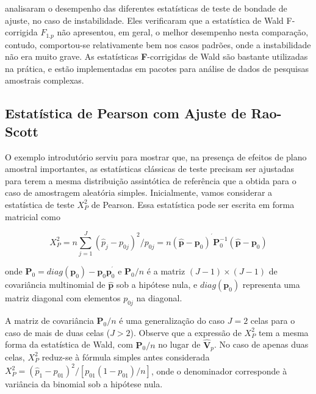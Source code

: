 \documentclass[]{book}
\theoremstyle{definition}
\theoremstyle{definition}
\theoremstyle{definition}
\theoremstyle{remark}
\begin{document}
\citep{TR87} analisaram o desempenho das diferentes estatísticas de
teste de bondade de ajuste, no caso de instabilidade. Eles verificaram
que a estatística de Wald F-corrigida \(F_{1.p}\) não apresentou, em
geral, o melhor desempenho nesta comparação, contudo, comportou-se
relativamente bem nos casos padrões, onde a instabilidade não era muito
grave. As estatísticas \textbf{F}-corrigidas de Wald são bastante
utilizadas na prática, e estão implementadas em pacotes para análise de
dados de pesquisas amostrais complexas.

\subsection{Estatística de Pearson com Ajuste de
Rao-Scott}\label{raoscott}

O exemplo introdutório serviu para mostrar que, na presença de efeitos
de plano amostral importantes, as estatísticas clássicas de teste
precisam ser ajustadas para terem a mesma distribuição assintótica de
referência que a obtida para o caso de amostragem aleatória simples.
Inicialmente, vamos considerar a estatística de teste \(X_{P}^{2}\) de
Pearson\(.\) Essa estatística pode ser escrita em forma matricial como

\begin{equation}
X_{P}^{2}=n\sum\limits_{j=1}^{J}\left( \widehat{p}_{j}-p_{0j}\right)
^{2}/p_{0j}=n\left( \widehat{\mathbf{p}}-\mathbf{p}_{0}\right) ^{^{\prime }}
\mathbf{P}_{0}^{-1}\left( \widehat{\mathbf{p}}-\mathbf{p}_{0}\right) 
\label{eq:qual11}
\end{equation}

onde
\(\mathbf{P}_{0}=diag\left( \mathbf{p}_{0}\right) -\mathbf{p}_{0}\mathbf{p}_{0}^{^{\prime }}\)
e \(\mathbf{P}_{0}/n\) é a matriz
\(\left( J-1\right)\times \left( J-1\right)\) de covariância multinomial
de \(\widehat{\mathbf{p}}\) sob a hipótese nula, e
\(diag\left( \mathbf{p}_{0}\right)\) representa uma matriz diagonal com
elementos \(p_{0j}\) na diagonal.

A matriz de covariância \(\mathbf{P}_{0}/n\) é uma generalização do caso
\(J=2\) celas para o caso de mais de duas celas (\(J>2\)). Observe que a
expressão de \(X_{P}^{2}\) tem a mesma forma da estatística de Wald, com
\(\mathbf{P}_{0}/n\) no lugar de \(\widehat{\mathbf{V}}_{p}\). No caso
de apenas duas celas, \(X_{P}^{2}\) reduz-se à fórmula simples antes
considerada
\(X_{P}^{2}=\left( \widehat{p}_{1}-p_{01}\right) ^{2}/\left[ p_{01}\left( 1-p_{01}\right) /n\right]\),
onde o denominador corresponde à variância da binomial sob a hipótese
nula.
\end{document}
